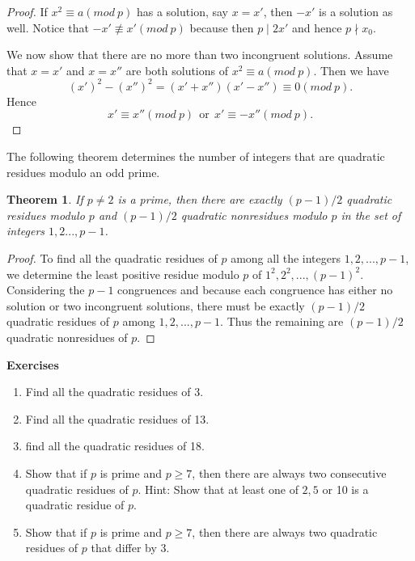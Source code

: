 \documentclass[12pt,letterpaper]{book}
\newtheorem{theorem}{Theorem}
\begin{document}
\begin{proof}
If $x^2\equiv a(mod \ p)$ has a solution, say $x=x'$, then $-x'$ is
a solution as well.  Notice that $-x' \not\equiv x'(mod \ p)$
because then $p\mid 2x'$ and hence $p\nmid x_0$.
\par We now show that there are no more than two incongruent
solutions.  Assume that $x=x'$ and $x=x''$ are both solutions of
$x^2\equiv a(mod \ p)$.  Then we have
\begin{equation*}
(x')^2- (x'')^2=(x'+x'')(x'-x'')\equiv 0(mod \ p).
\end{equation*}
Hence
\begin{equation*}
x'\equiv x''(mod \ p)\ \ \mbox{or} \ \ x'\equiv -x''(mod \ p).
\end{equation*}
\end{proof}

The following theorem determines the number of integers that are
quadratic residues modulo an odd prime.

\begin{theorem}
If $p\neq 2$ is a prime, then there are exactly $(p-1)/2$ quadratic
residues modulo $p$ and $(p-1)/2$ quadratic nonresidues modulo $p$
in the set of integers $1,2...,p-1$.
\end{theorem}

\begin{proof}
To find all the quadratic residues of $p$ among all the integers
$1,2,...,p-1$, we determine the least positive residue modulo $p$ of
$1^2,2^2,...,(p-1)^2$. Considering the $p-1$ congruences and because
each congruence has either no solution or two incongruent solutions,
there must be exactly $(p-1)/2$ quadratic residues of $p$ among
$1,2,...,p-1$. Thus the remaining are $(p-1)/2$ quadratic
nonresidues of $p$.
\end{proof}

\textbf{Exercises}
\begin{enumerate}
\item{Find all the quadratic residues of 3.} \item{Find all the
quadratic residues of 13.} \item{find all the quadratic residues of
18.}\item{Show that if $p$ is prime and $p\geq 7$, then there are
always two consecutive quadratic residues of $p$.  Hint: Show that
at least one of $2,5$ or 10 is a quadratic residue of
$p$.}\item{Show that if $p$ is prime and $p\geq 7$, then there are
always two quadratic residues of $p$ that differ by 3.}
\end{enumerate}
\end{document}
